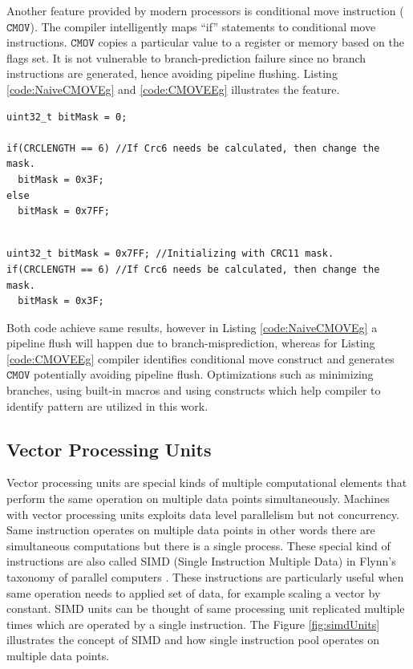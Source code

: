 Another feature provided by modern processors is conditional move instruction ($\mathtt{CMOV}$). The compiler intelligently maps ``if'' statements to conditional move instructions. $\mathtt{CMOV}$ copies a particular value to a register or memory based on the flags set. It is not vulnerable to branch-prediction failure since no branch instructions are generated, hence avoiding pipeline flushing. Listing \ref{code:NaiveCMOVEg} and \ref{code:CMOVEEg} illustrates the feature.

\begin{code}
	\label{code:NaiveCMOVEg}
\begin{verbatim}
uint32_t bitMask = 0;

if(CRCLENGTH == 6) //If Crc6 needs be calculated, then change the mask.
  bitMask = 0x3F;
else
  bitMask = 0x7FF;
  
\end{verbatim}
\end{code}

\begin{code}
	\label{code:CMOVEEg}
\begin{verbatim}
uint32_t bitMask = 0x7FF; //Initializing with CRC11 mask.
if(CRCLENGTH == 6) //If Crc6 needs be calculated, then change the mask.
  bitMask = 0x3F;
\end{verbatim}
\end{code}

Both code achieve same results, however in Listing \ref{code:NaiveCMOVEg} a pipeline flush will happen due to branch-misprediction, whereas for Listing \ref{code:CMOVEEg} compiler identifies conditional move construct and generates $\mathtt{CMOV}$ potentially avoiding pipeline flush. Optimizations such as minimizing branches, using built-in macros and using constructs which help compiler to identify pattern are utilized in this work.

\subsection{Vector Processing Units}
Vector processing units are special kinds of multiple computational elements that perform the same operation on multiple data points simultaneously. Machines with vector processing units exploits data level parallelism but not concurrency. Same instruction operates on multiple data points in other words there are simultaneous computations but there is a single process. These special kind of instructions are also called SIMD (Single Instruction Multiple Data) in Flynn's taxonomy of parallel computers \cite{Hennessy}. These instructions are particularly useful when same operation needs to applied set of data, for example scaling a vector by constant. SIMD units can be thought of same processing unit replicated multiple times which are operated by a single instruction. The Figure \ref{fig:simdUnits} illustrates the concept of SIMD and how single instruction pool operates on multiple data points.

